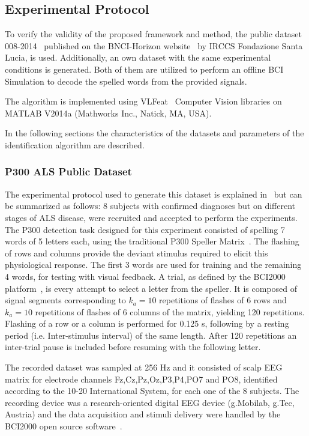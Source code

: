 \documentclass[entropy,article,submit,moreauthors,pdftex,10pt,a4paper]{mdpi}
\begin{document}
\subsection{Experimental Protocol} \label{Protocol}

To verify the validity of the proposed framework and method, the public dataset 008-2014~\citep{Riccio2013} published on the BNCI-Horizon website~\citep{Brunner2014} by  IRCCS Fondazione Santa Lucia, is used. Additionally, an own dataset with  the same experimental conditions is generated. Both of them are utilized to perform an offline BCI Simulation to decode the spelled words from the provided signals. 

The algorithm is implemented using  VLFeat~\citep{Vedaldi2010} Computer Vision libraries on MATLAB V2014a (Mathworks Inc., Natick, MA, USA). 

In the following sections the characteristics of the datasets and parameters of the identification algorithm are described. 

\subsubsection{P300 ALS Public Dataset} \label{ALSDataset}

The experimental protocol used to generate this dataset is explained in~\citep{Riccio2013} but can be summarized as follows:  8 subjects with confirmed diagnoses but on different stages of ALS disease, were recruited and accepted to perform the experiments. The P300 detection task designed for this experiment consisted of spelling 7 words of 5 letters each, using the traditional P300 Speller Matrix~\citep{Farwell1988}. The flashing of rows and columns provide the deviant stimulus required to elicit this physiological response.  The first 3 words are used for training and the remaining 4 words, for testing with visual feedback.  A trial, as defined by the BCI2000 platform~\citep{Schalk2004}, is every attempt to select a letter from the speller. It is composed of signal segments corresponding to $k_a =10$ repetitions of flashes of 6 rows and $k_a =10$ repetitions of flashes of 6 columns of the matrix, yielding 120 repetitions.  Flashing of a row or a column is performed for 0.125 s, following by a resting period (i.e. Inter-stimulus interval) of the same length.  After 120 repetitions an inter-trial pause is included before resuming with the following letter.

The recorded dataset was sampled at 256 Hz and it consisted of scalp EEG matrix for electrode channels Fz,Cz,Pz,Oz,P3,P4,PO7 and PO8, identified according to the 10-20 International System,  for each one of the 8 subjects.   The recording device was a research-oriented digital EEG device (g.Mobilab, g.Tec, Austria) and the data acquisition and stimuli delivery were handled by the BCI2000 open source software~\citep{Schalk2004}.
\end{document}
